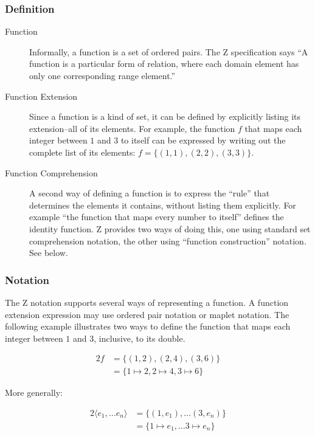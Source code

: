 \documentclass[reqno,12pt]{article}
\numberwithin{equation}{subsection}
\begin{document}
\subsubsection{Definition}

\begin{description}
\item [Function] Informally, a function is a set of ordered pairs.
  The Z specification says ``A function is a particular form of
  relation, where each domain element has only one corresponding range
  element.''\parencite[9]{z-iso-13568}
\item [Function Extension] Since a function is a kind of set, it can
  be defined by explicitly listing its extension--all of its elements.
  For example, the function $f$ that maps each integer between $1$ and
  $3$ to itself can be expressed by writing out the complete list of
  its elements: ${f=\{(1,1),(2,2),(3,3)\}}$.
\item [Function Comprehension] A second way of defining a function is
  to express the ``rule'' that determines the elements it contains,
  without listing them explicitly.  For example ``the function that
  maps every number to itself'' defines the identity function.  Z provides
  two ways of doing this, one using standard set comprehension
  notation, the other using ``function construction'' notation.  See
  below.
\end{description}

\subsubsection{Notation}

The Z notation supports several ways of representing a function.  A
function extension expression may use ordered pair notation or maplet
notation.  The following example illustrates two ways to define the
function that maps each integer between $1$ and $3$, inclusive, to its
double.

\begin{alignat}{2}
  f &= \{(1,2),(2,4),(3,6)\} \\
  &= \{1\mapsto 2, 2\mapsto 4, 3\mapsto 6\}
\end{alignat}

\noindent More generally:

\begin{alignat}{2}
  \langle e_1,\ldots e_n\rangle &= \{(1,e_1),\ldots (3,e_n)\} \\
  &= \{1\mapsto e_1,\ldots 3\mapsto e_n\}
\end{alignat}
\end{document}
